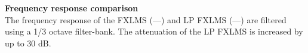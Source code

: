\begin{minipage}{.43\columnwidth}
\textbf{Frequency response comparison}\\
The frequency response of the FXLMS (\textcolor{MATLABblue}{---}) and LP FXLMS (\textcolor{MATLABred}{---}) are filtered using a 1/3 octave filter-bank.
The attenuation of the LP FXLMS is increased by up to 30 dB.


\end{minipage}%
\hspace{5mm}
\begin{minipage}{0.5\columnwidth}
	\begin{center}
	
	\end{center}
\end{minipage}
